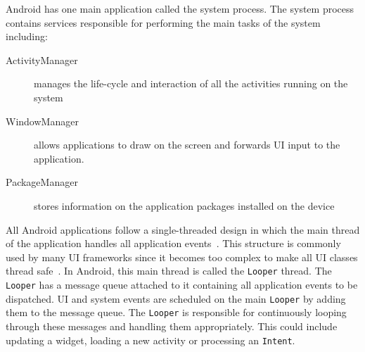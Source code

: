 \documentclass{acm_proc_article-sp}
\begin{document}
Android has one main application called the system process. The system process contains services responsible for performing the main
tasks of the system including:
\vspace{-10pt}
\begin{description}
 \item [ActivityManager] manages the life-cycle and interaction of all the activities running on the system
 \item [WindowManager] allows applications to draw on the screen and forwards UI input to the application.
 \item [PackageManager] stores information on the application packages installed on the device
\end{description}
\vspace{-5pt}
All Android applications follow a single-threaded design in which the main thread of the application handles all application
events~\cite{AndroidDocs}. This structure is commonly used by many UI frameworks since it becomes too complex to make all UI classes thread
safe~\cite{SingleThread}. In Android, this main thread is called the \texttt{Looper} thread. The \texttt{Looper} has a message queue
attached to it containing all application events to be dispatched. UI and system events are scheduled on the main \texttt{Looper} by adding
them to the message queue. The \texttt{Looper} is responsible for continuously looping through these messages and handling them
appropriately. This could include updating a widget, loading a new activity or processing an \texttt{Intent}.
\end{document}
